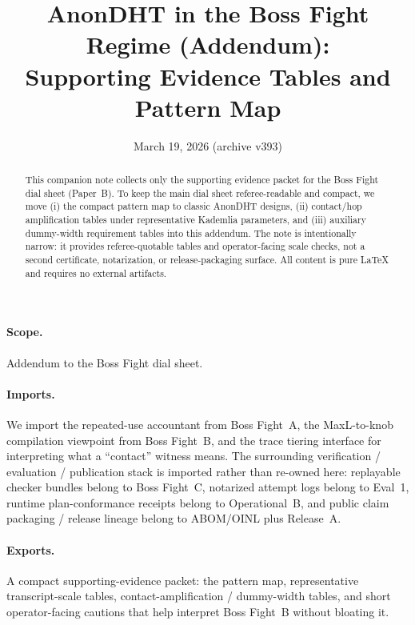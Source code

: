 \documentclass[11pt]{article}
\title{AnonDHT in the Boss Fight Regime (Addendum):\\Supporting Evidence Tables and Pattern Map}
\author{}
\date{March 19, 2026 (archive v393)}
\begin{document}
\maketitle

\begin{abstract}
This companion note collects only the supporting evidence packet for the Boss Fight dial sheet (Paper~B).
To keep the main dial sheet referee-readable and compact, we move (i) the compact pattern map to classic AnonDHT designs,
(ii) contact/hop amplification tables under representative Kademlia parameters, and (iii) auxiliary dummy-width requirement tables into this addendum.
The note is intentionally narrow: it provides referee-quotable tables and operator-facing scale checks, not a second certificate, notarization, or release-packaging surface.
All content is pure \LaTeX{} and requires no external artifacts.
\end{abstract}

\paragraph{Scope.}
Addendum to the Boss Fight dial sheet.\cite{series:bossfightB}

\paragraph{Imports.}
We import the repeated-use accountant from Boss Fight~A, the MaxL-to-knob compilation viewpoint from Boss Fight~B, and the trace tiering interface for interpreting what a ``contact'' witness means.\cite{series:bossfightA,series:bossfightB,series:traceifaces}
The surrounding verification / evaluation / publication stack is imported rather than re-owned here: replayable checker bundles belong to Boss Fight~C, notarized attempt logs belong to Eval~1, runtime plan-conformance receipts belong to Operational~B, and public claim packaging / release lineage belong to ABOM/OINL plus Release~A.\cite{series:bossfightC,series:evalnotary,series:opB,series:abomoinl,series:releaseproperty}

\paragraph{Exports.}
A compact supporting-evidence packet: the pattern map, representative transcript-scale tables, contact-amplification / dummy-width tables, and short operator-facing cautions that help interpret Boss Fight~B without bloating it.
\end{document}
